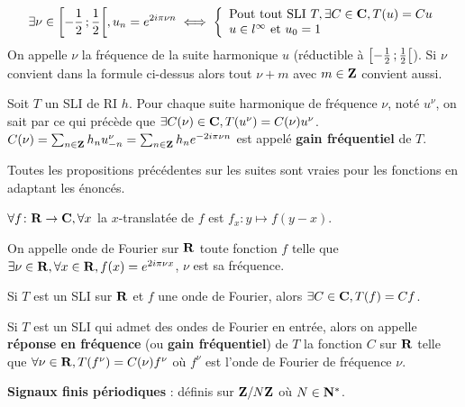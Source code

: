\begin{pop}
	$$\exists \nu \in \mathopen{}\mathclose{\left[-\frac{1}{2}\mathclose{}\mathpunct{};\frac{1}{2}\right[}, u_n = e^{2i\pi \nu n} \iff
	\left\{\begin{array}{l}
		\text{Pout tout SLI } T, \exists C \in \mathbf{C}, T(u) = Cu \\
		u \in l^\infty \text{ et } u_0 = 1
	\end{array}\right.$$
	On appelle $\nu$ la fréquence de la suite harmonique $u$ (réductible à $\mathopen{}\mathclose{\left[-\frac{1}{2}\mathclose{}\mathpunct{};\frac{1}{2}\right[}$).
	Si $\nu$ convient dans la formule ci-dessus alors tout $\nu + m$ avec $m \in \mathbf{Z}$ convient aussi.
\end{pop}

\begin{pop}
	Soit $T$ un SLI de RI $h$.
	Pour chaque suite harmonique de fréquence $\nu$, noté $u^\nu$, on sait par ce qui précède que $\exists C(\nu) \in \mathbf{C}, T(u^\nu) = C(\nu)u^\nu$.
	$C(\nu) = \sum_{n \in \mathbf{Z}} h_n u^\nu_{-n} = \sum_{n \in \mathbf{Z}} h_n e^{-2i\pi \nu n}$ est appelé \textbf{gain fréquentiel} de $T$.
\end{pop}

Toutes les propositions précédentes sur les suites sont vraies pour les fonctions en adaptant les énoncés.

\begin{defn}
	$\forall f \colon \mathbf{R} \to \mathbf{C}, \forall x$ la $x$-translatée de $f$ est $f_x \colon y \mapsto f(y - x)$.
\end{defn}

\begin{defn}
	On appelle onde de Fourier sur $\mathbf{R}$ toute fonction $f$ telle que $\exists \nu \in \mathbf{R}, \forall x \in \mathbf{R}, f(x) = e^{2i\pi \nu x}$, $\nu$ est sa fréquence.
\end{defn}

\begin{pop}
	Si $T$ est un SLI sur $\mathbf{R}$ et $f$ une onde de Fourier, alors $\exists C \in \mathbf{C}, T(f) = Cf$.
\end{pop}

	\begin{defn}
	Si $T$ est un SLI qui admet des ondes de Fourier en entrée, alors on appelle \textbf{réponse en fréquence} (ou \textbf{gain fréquentiel}) de $T$ la fonction $C$ sur $\mathbf{R}$ telle que $\forall \nu \in \mathbf{R}, T(f^\nu) = C(\nu) f^\nu$ où $f^\nu$ est l'onde de Fourier de fréquence $\nu$.
\end{defn}

\begin{defn}
	\textbf{Signaux finis périodiques} : définis sur $\mathbf{Z} / N\mathbf{Z}$ où $N \in \mathbf{N}^*$.
\end{defn}

